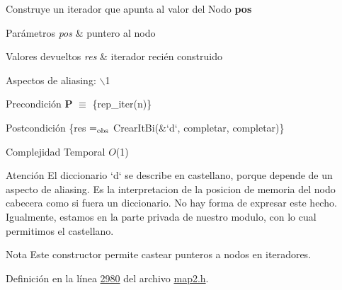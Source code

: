 \-Construye un iterador que apunta al valor del \-Nodo {\bfseries pos} 


\begin{DoxyParams}{\-Parámetros}
{\em pos} & puntero al nodo \\
\hline
\end{DoxyParams}

\begin{DoxyRetVals}{\-Valores devueltos}
{\em res} & iterador recién construido\\
\hline
\end{DoxyRetVals}
\begin{DoxyParagraph}{\-Aspectos de aliasing\-:}
$\backslash$1
\end{DoxyParagraph}
\begin{DoxyPrecond}{\-Precondición}
{\bfseries \-P} $\equiv$ \{rep\-\_\-iter(n)\} 
\end{DoxyPrecond}
\begin{DoxyPostcond}{\-Postcondición}
\{res $=_{\rm obs}$ \-Crear\-It\-Bi(\&`d`, completar, completar)\}
\end{DoxyPostcond}

\begin{DoxyDescription}
\item[\-Complejidad \-Temporal]$O$(1)
\end{DoxyDescription}

\begin{DoxyAttention}{\-Atención}
\-El diccionario `d` se describe en castellano, porque depende de un aspecto de aliasing. \-Es la interpretacion de la posicion de memoria del nodo cabecera como si fuera un diccionario. \-No hay forma de expresar este hecho. \-Igualmente, estamos en la parte privada de nuestro modulo, con lo cual permitimos el castellano.
\end{DoxyAttention}
\begin{DoxyNote}{\-Nota}
\-Este constructor permite castear punteros a nodos en iteradores. 
\end{DoxyNote}


\-Definición en la línea \hyperlink{map2_8h_source_l02980}{2980} del archivo \hyperlink{map2_8h_source}{map2.\-h}.



